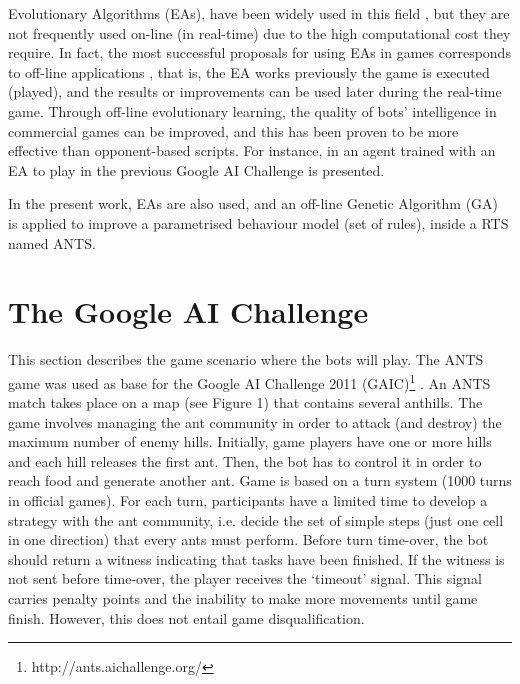 \documentclass[runningheads]{llncs}
\begin{document}
Evolutionary Algorithms (EAs), have been widely used in this field \cite{Ponsen_EvLearn_RTS,Su-EAs_StrategySel09}, 
but they are not frequently used on-line (in real-time) due to the high computational cost they require. In fact, the most successful proposals for using EAs in games corresponds to off-line applications \cite{offline-evolutionary-learning}, that is, the EA works previously the game is executed (played), and the results or improvements can be used later during  the real-time game. Through off-line evolutionary learning, the quality of bots' intelligence in commercial games can be improved, and this has been proven to be more effective than opponent-based scripts.
For instance, in \cite{GENEBOTEVOSTAR12} an agent trained with an EA to play in the previous Google AI Challenge is presented. %


In the present work, EAs are also used, and an off-line Genetic Algorithm (GA) is applied to improve a parametrised behaviour model (set of rules), inside a RTS named ANTS.




\section{The Google AI Challenge}

This section describes the game scenario where the bots will play. The ANTS game was used as base for the Google AI Challenge 2011
 (GAIC)\footnote{http://ants.aichallenge.org/} \cite{holdum2011google}. An ANTS match takes place on a map (see Figure 1) %
that contains several anthills. The game involves managing the ant community in order to attack (and destroy) the maximum number of enemy hills. Initially, game players have one or more hills and each hill releases the first ant. Then, the bot has to control it in order to reach food and generate another ant. Game is based on a turn system (1000 turns in official games). For each turn, participants have a limited time to develop a strategy with the ant community, i.e. decide the set of simple steps (just one cell in one direction) that every ants must perform.
Before turn time-over, the bot should return a witness indicating that tasks have been finished. If the witness is not sent before time-over, the player receives the `timeout' signal. This signal carries penalty points and the inability to make more movements until game finish. However, this does not entail game disqualification. 
\end{document}
